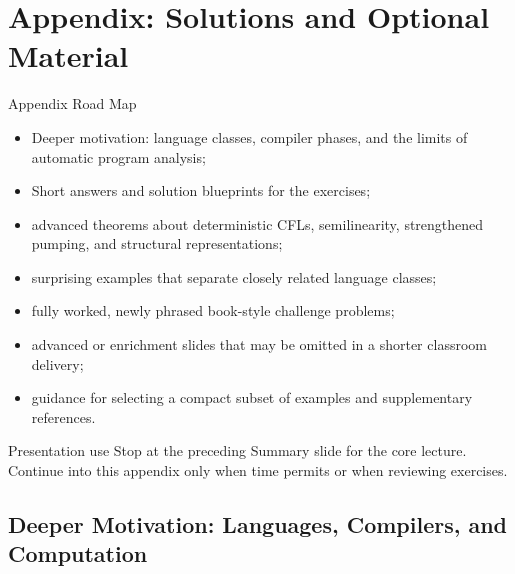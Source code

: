 \documentclass[10pt]{beamer}
\begin{document}
\appendix
\section{Appendix: Solutions and Optional Material}

\begin{frame}{Appendix Road Map}
  \begin{itemize}
    \item Deeper motivation: language classes, compiler phases, and the
      limits of automatic program analysis;
    \item Short answers and solution blueprints for the exercises;
    \item advanced theorems about deterministic CFLs, semilinearity,
      strengthened pumping, and structural representations;
    \item surprising examples that separate closely related language classes;
    \item fully worked, newly phrased book-style challenge problems;
    \item advanced or enrichment slides that may be omitted in a shorter
      classroom delivery;
    \item guidance for selecting a compact subset of examples and
      supplementary references.
  \end{itemize}
  \begin{block}{Presentation use}
    Stop at the preceding Summary slide for the core lecture. Continue into
    this appendix only when time permits or when reviewing exercises.
  \end{block}
\end{frame}

\subsection{Deeper Motivation: Languages, Compilers, and Computation}
\end{document}
